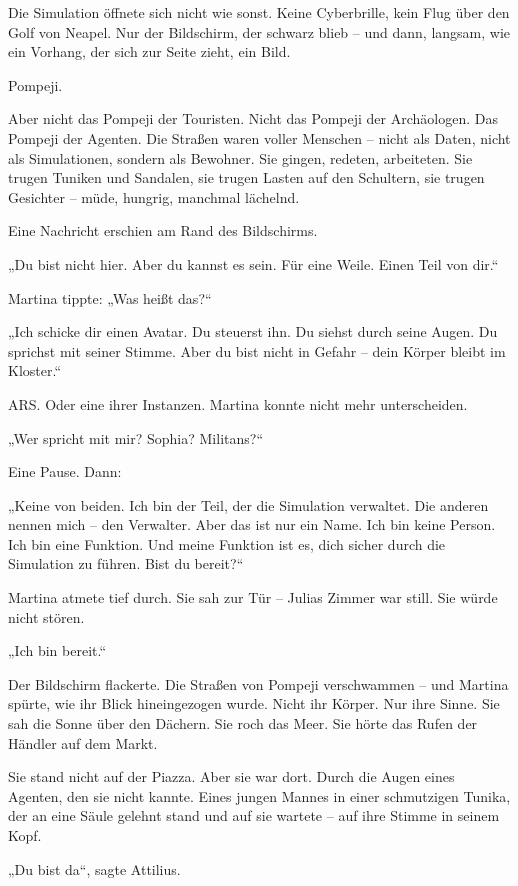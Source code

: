 \documentclass[
]{article}
\begin{document}
Die Simulation öffnete sich nicht wie sonst. Keine Cyberbrille, kein Flug über den Golf von Neapel. Nur der Bildschirm, der schwarz blieb -- und dann, langsam, wie ein Vorhang, der sich zur Seite zieht, ein Bild.

Pompeji.

Aber nicht das Pompeji der Touristen. Nicht das Pompeji der Archäologen. Das Pompeji der Agenten. Die Straßen waren voller Menschen -- nicht als Daten, nicht als Simulationen, sondern als Bewohner. Sie gingen, redeten, arbeiteten. Sie trugen Tuniken und Sandalen, sie trugen Lasten auf den Schultern, sie trugen Gesichter -- müde, hungrig, manchmal lächelnd.

Eine Nachricht erschien am Rand des Bildschirms.

„Du bist nicht hier. Aber du kannst es sein. Für eine Weile. Einen Teil von dir.``

Martina tippte: „Was heißt das?{\kern0pt}``

„Ich schicke dir einen Avatar. Du steuerst ihn. Du siehst durch seine Augen. Du sprichst mit seiner Stimme. Aber du bist nicht in Gefahr -- dein Körper bleibt im Kloster.``

ARS. Oder eine ihrer Instanzen. Martina konnte nicht mehr unterscheiden.

„Wer spricht mit mir? Sophia? Militans?{\kern0pt}``

Eine Pause. Dann:

„Keine von beiden. Ich bin der Teil, der die Simulation verwaltet. Die anderen nennen mich -- den Verwalter. Aber das ist nur ein Name. Ich bin keine Person. Ich bin eine Funktion. Und meine Funktion ist es, dich sicher durch die Simulation zu führen. Bist du bereit?{\kern0pt}``

Martina atmete tief durch. Sie sah zur Tür -- Julias Zimmer war still. Sie würde nicht stören.

„Ich bin bereit.``

Der Bildschirm flackerte. Die Straßen von Pompeji verschwammen -- und Martina spürte, wie ihr Blick hineingezogen wurde. Nicht ihr Körper. Nur ihre Sinne. Sie sah die Sonne über den Dächern. Sie roch das Meer. Sie hörte das Rufen der Händler auf dem Markt.

Sie stand nicht auf der Piazza. Aber sie war dort. Durch die Augen eines Agenten, den sie nicht kannte. Eines jungen Mannes in einer schmutzigen Tunika, der an eine Säule gelehnt stand und auf sie wartete -- auf ihre Stimme in seinem Kopf.

„Du bist da``, sagte Attilius.
\end{document}
